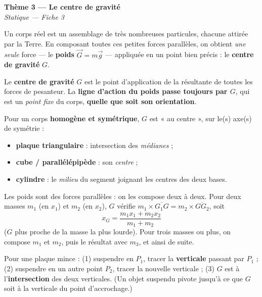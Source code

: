 \documentclass[11pt,a4paper]{article}
\newcommand{\vv}[1]{\vec{#1}}\newcommand{\ds}{\displaystyle}
\begin{document}
\begin{center}
{\LARGE\bfseries\color{primarydark}Thème 3 — Le centre de gravité}\\[2pt]
{\color{primary}\itshape Statique — Fiche 3}
\end{center}
\vspace{1mm}

Un corps réel est un assemblage de très nombreuses particules, chacune attirée par la Terre. En
composant toutes ces petites forces parallèles, on obtient \emph{une seule} force — le \textbf{poids}
$\vv G=m\vv g$ — appliquée en un point bien précis : le \textbf{centre de gravité} $G$.

\begin{cle}
Le \textbf{centre de gravité} $G$ est le point d'application de la résultante de toutes les forces de
pesanteur. La \textbf{ligne d'action du poids passe toujours par $G$}, qui est un \emph{point fixe} du
corps, \textbf{quelle que soit son orientation}.
\end{cle}

\begin{cle}
Pour un corps \textbf{homogène et symétrique}, $G$ est « au centre », sur le(s) axe(s) de symétrie :
\begin{itemize}[leftmargin=1.5em,topsep=1pt,itemsep=1pt]
  \item \textbf{plaque triangulaire} : intersection des \emph{médianes} ;
  \item \textbf{cube / parallélépipède} : son \emph{centre} ;
  \item \textbf{cylindre} : le \emph{milieu} du segment joignant les centres des deux bases.
\end{itemize}
\end{cle}

\begin{methode}
Les poids sont des forces parallèles : on les compose deux à deux. Pour deux masses $m_1$ (en $x_1$)
et $m_2$ (en $x_2$), $G$ vérifie $m_1\times\overline{G_1 G} = m_2\times\overline{G G_2}$, soit
\[
\boxed{\,x_G = \frac{m_1 x_1 + m_2 x_2}{m_1 + m_2}\,}
\]
($G$ plus proche de la masse la plus lourde). Pour trois masses ou plus, on compose $m_1$ et $m_2$,
puis le résultat avec $m_3$, et ainsi de suite.
\end{methode}

\begin{methode}
Pour une plaque mince : (1) suspendre en $P_1$, tracer la \textbf{verticale} passant par $P_1$ ;
(2) suspendre en un autre point $P_2$, tracer la nouvelle verticale ; (3) $G$ est à l'\textbf{intersection}
des deux verticales. (Un objet suspendu pivote jusqu'à ce que $G$ soit à la verticale du point
d'accrochage.)
\end{methode}
\end{document}
